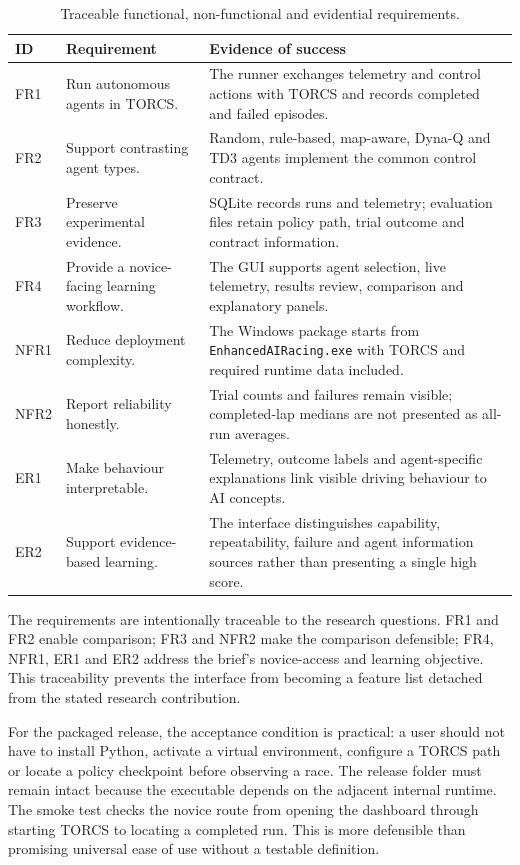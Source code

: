 \begin{table}[htbp]
  \centering
  \caption{Traceable functional, non-functional and evidential requirements.}
  \label{tab:requirements}
  \small
  \begin{tabularx}{\textwidth}{p{}p{}Y}
    \toprule
    ID & Requirement & Evidence of success \\
    \midrule
    FR1 & Run autonomous agents in TORCS. & The runner exchanges telemetry and control actions with TORCS and records completed and failed episodes. \\
    FR2 & Support contrasting agent types. & Random, rule-based, map-aware, Dyna-Q and TD3 agents implement the common control contract. \\
    FR3 & Preserve experimental evidence. & SQLite records runs and telemetry; evaluation files retain policy path, trial outcome and contract information. \\
    FR4 & Provide a novice-facing learning workflow. & The GUI supports agent selection, live telemetry, results review, comparison and explanatory panels. \\
    NFR1 & Reduce deployment complexity. & The Windows package starts from \texttt{EnhancedAIRacing.exe} with TORCS and required runtime data included. \\
    NFR2 & Report reliability honestly. & Trial counts and failures remain visible; completed-lap medians are not presented as all-run averages. \\
    ER1 & Make behaviour interpretable. & Telemetry, outcome labels and agent-specific explanations link visible driving behaviour to AI concepts. \\
    ER2 & Support evidence-based learning. & The interface distinguishes capability, repeatability, failure and agent information sources rather than presenting a single high score. \\
    \bottomrule
  \end{tabularx}
\end{table}

The requirements are intentionally traceable to the research questions. FR1 and FR2 enable comparison; FR3 and NFR2 make the comparison defensible; FR4, NFR1, ER1 and ER2 address the brief's novice-access and learning objective. This traceability prevents the interface from becoming a feature list detached from the stated research contribution.

For the packaged release, the acceptance condition is practical: a user should not have to install Python, activate a virtual environment, configure a TORCS path or locate a policy checkpoint before observing a race. The release folder must remain intact because the executable depends on the adjacent internal runtime. The smoke test checks the novice route from opening the dashboard through starting TORCS to locating a completed run. This is more defensible than promising universal ease of use without a testable definition.

